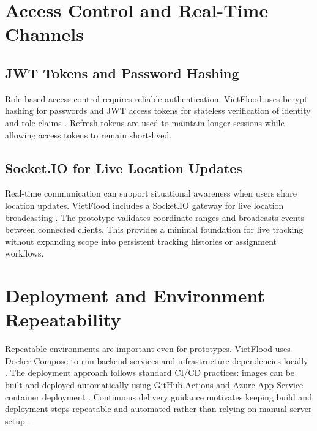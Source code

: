 \section{Access Control and Real-Time Channels}

\subsection{JWT Tokens and Password Hashing}

Role-based access control requires reliable authentication. VietFlood uses bcrypt hashing for passwords \cite{provos1999bcrypt} and JWT access tokens for stateless verification of identity and role claims \cite{jones2015jwt}. Refresh tokens are used to maintain longer sessions while allowing access tokens to remain short-lived.

\subsection{Socket.IO for Live Location Updates}

Real-time communication can support situational awareness when users share location updates. VietFlood includes a Socket.IO gateway for live location broadcasting \cite{socketioDocs}. The prototype validates coordinate ranges and broadcasts events between connected clients. This provides a minimal foundation for live tracking without expanding scope into persistent tracking histories or assignment workflows.

\section{Deployment and Environment Repeatability}

Repeatable environments are important even for prototypes. VietFlood uses Docker Compose to run backend services and infrastructure dependencies locally \cite{dockerComposeDocs}. The deployment approach follows standard CI/CD practices: images can be built and deployed automatically using GitHub Actions and Azure App Service container deployment \cite{githubActionsDocs,azureAppServiceContainersDocs}. Continuous delivery guidance motivates keeping build and deployment steps repeatable and automated rather than relying on manual server setup \cite{humble2010continuousDelivery,kim2016devopsHandbook}.
